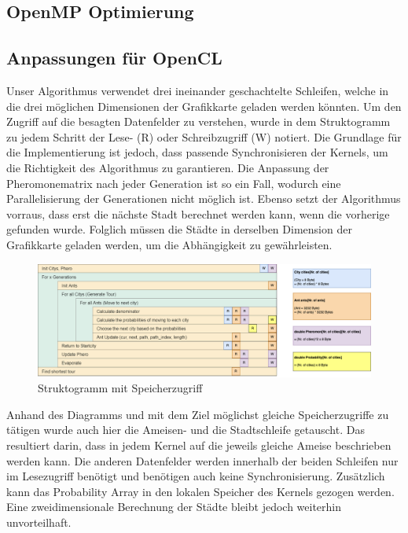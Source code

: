\subsection*{OpenMP Optimierung}

\subsection*{Anpassungen für OpenCL}

Unser Algorithmus verwendet drei ineinander geschachtelte Schleifen, welche in die drei möglichen Dimensionen der Grafikkarte geladen werden könnten.
Um den Zugriff auf die besagten Datenfelder zu verstehen, wurde in dem Struktogramm zu jedem Schritt der Lese- (R) oder Schreibzugriff (W) notiert.
Die Grundlage für die Implementierung ist jedoch, dass passende Synchronisieren der Kernels, um die Richtigkeit des Algorithmus zu garantieren.
Die Anpassung der Pheromonematrix nach jeder Generation ist so ein Fall, wodurch eine Parallelisierung der Generationen nicht möglich ist.
Ebenso setzt der Algorithmus vorraus, dass erst die nächste Stadt berechnet werden kann, wenn die vorherige gefunden wurde.
Folglich müssen die Städte in derselben Dimension der Grafikkarte geladen werden, um die Abhängigkeit zu gewährleisten.

\begin{figure}[h]
    \centering
    \includegraphics[width=\textwidth]{../images/Speicherzugriff.png}
    \caption{Struktogramm mit Speicherzugriff}
    \label{fig:struktogramm-speicher}
\end{figure}

Anhand des Diagramms und mit dem Ziel möglichst gleiche Speicherzugriffe zu tätigen wurde auch hier die Ameisen- und die Stadtschleife getauscht.
Das resultiert darin, dass in jedem Kernel auf die jeweils gleiche Ameise beschrieben werden kann.
Die anderen Datenfelder werden innerhalb der beiden Schleifen nur im Lesezugriff benötigt und benötigen auch keine Synchronisierung.
Zusätzlich kann das Probability Array in den lokalen Speicher des Kernels gezogen werden.
Eine zweidimensionale Berechnung der Städte bleibt jedoch weiterhin unvorteilhaft.

